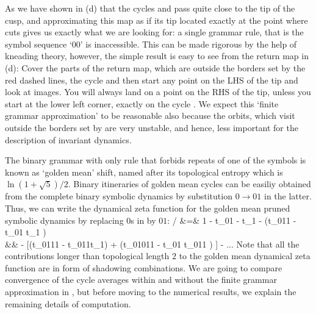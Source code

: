 As we have shown in  (d) that the cycles  
and  pass quite close to the tip of the cusp, and approximating this 
map as if its tip located exactly at the point where  cuts gives us 
exactly what we are looking for: a single grammar rule, that is the symbol 
sequence `00' is inaccessible. This can be made rigorous by the help of 
kneading theory, however, the simple result is easy to see from the return map 
in  (d): Cover the parts of the return map, which 
are outside the borders set by the red dashed lines, the cycle  and 
then start any point on the LHS of the tip and look at images. You will always 
land on a point on the RHS of the tip, unless you start at the lower left 
corner, exactly on the cycle . We expect this `finite grammar 
approximation' to be reasonable also because the orbits, which visit outside 
the borders set by  are very unstable, and hence, less 
important for the description of invariant dynamics.

The binary grammar with only rule that forbids repeats of one of the symbols is
known as `golden mean' shift, named after its topological entropy which is 
$\ln (1 + \sqrt{5})/2$. Binary itineraries of golden mean cycles can be easiliy
obtained from the complete binary symbolic dynamics by substitution
$0 \rightarrow 01$ in  the latter. Thus, we can write the dynamical zeta
function for the golden mean pruned symbolic dynamics by replacing $0$s in
 by $01$:
 / \zeta &=& 1 - t_{01} - t_1 - (t_{011} - t_{01} t_1 ) 
              \label{e-GoldenMeanCycleExpansion}\\
		  && - [(t_{0111} - t_{011}t_1) + (t_{01011} - t_{01} t_{011} ) ] - ... 
          \nonumber
\eea
Note that all the contributions longer than topological length $2$ to the 
golden mean dynamical zeta function are in form of shadowing combinations. We
are going to compare convergence of the cycle averages within and without the 
finite grammar approximation in , but before moving to 
the numerical results, we explain the remaining details of computation.

